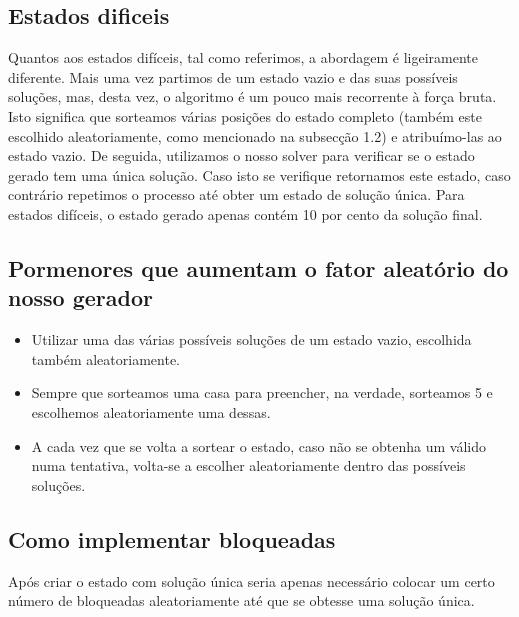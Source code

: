 \documentclass{article}
\begin{document}
\subsection{Estados dificeis}

Quantos aos estados difíceis, tal como referimos, a abordagem é ligeiramente diferente. Mais uma vez partimos de um estado vazio e das suas possíveis
soluções, mas, desta vez, o algoritmo é um pouco mais recorrente à força bruta. Isto significa que sorteamos várias posições do estado completo (também este
escolhido aleatoriamente, como mencionado na subsecção 1.2) e atribuímo-las ao estado vazio. De seguida, utilizamos o nosso solver para verificar se o estado gerado
tem uma única solução. Caso isto se verifique retornamos este estado, caso contrário repetimos o processo até obter um estado de solução única.
Para estados difíceis, o estado gerado apenas contém 10 por cento da solução final.


\subsection{Pormenores que aumentam o fator aleatório do nosso gerador}
\begin{itemize}
	\item Utilizar uma das várias possíveis soluções de um estado vazio, escolhida também aleatoriamente.
	\item Sempre que sorteamos uma casa para preencher, na verdade, sorteamos 5 e escolhemos aleatoriamente uma dessas. 
	\item A cada vez que se volta a sortear o estado, caso não se obtenha um válido numa tentativa, volta-se a escolher aleatoriamente dentro das possíveis soluções.
\end{itemize}

\subsection{Como implementar bloqueadas}
Após criar o estado com solução única seria apenas necessário colocar um certo número de bloqueadas aleatoriamente até que se obtesse uma solução única.
\end{document}
